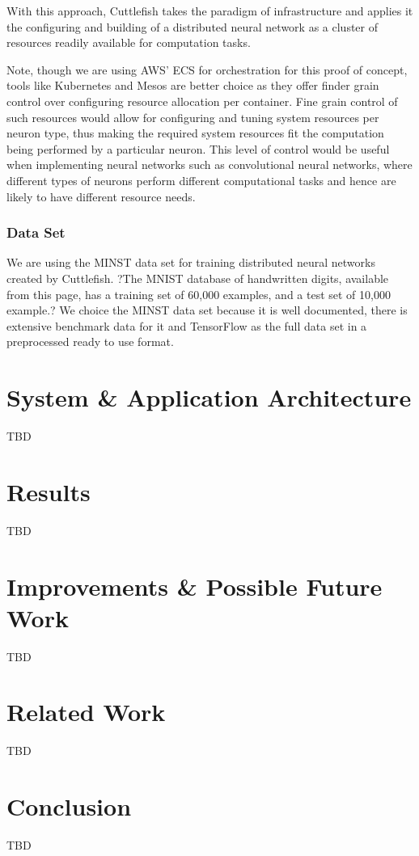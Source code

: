 \documentclass[conference]{IEEEtran}
\begin{document}
With this approach, Cuttlefish takes the paradigm of infrastructure and applies it the configuring and building of a distributed neural network as a cluster of resources readily available for computation tasks.

Note, though we are using AWS' ECS \cite{ecs-doc} for orchestration for this proof of concept, tools like Kubernetes and Mesos are better choice as they offer finder grain control over configuring resource allocation per container. Fine grain control of such resources would allow for configuring and tuning system resources per neuron type, thus making the required system resources fit the computation being performed by a particular neuron. This level of control would be useful when implementing neural networks such as convolutional neural networks, where different types of neurons perform different computational tasks and hence are likely to have different resource needs.

\subsubsection{Data Set}
We are using the MINST data set for training distributed neural networks created by Cuttlefish. ?The MNIST database of handwritten digits, available from this page, has a training set of 60,000 examples, and a test set of 10,000 example.? \cite{mnist-doc} We choice the MINST data set because it is well documented, there is extensive benchmark data for it and TensorFlow as the full data set in a preprocessed ready to use format.


\section{System \& Application Architecture}
TBD

\section{Results}
TBD

\section{Improvements \& Possible Future Work}
TBD

\section{Related Work}
TBD


\section{Conclusion}
TBD
\end{document}
